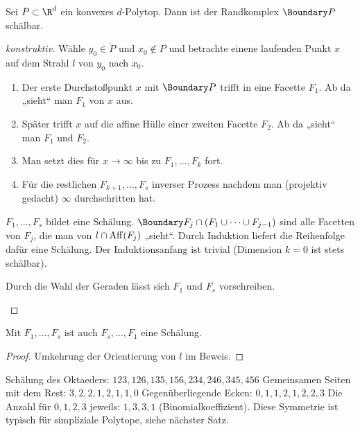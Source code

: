 \begin{st}
    Sei $P \subset \R^d$ ein konvexes $d$-Polytop.
    Dann ist der Randkomplex $\Boundary P$ schälbar.
    \begin{proof}[konstruktiv]
        Wähle $y_0 \in \mathring P$ und $x_0 \not\in P$ und betrachte einene laufenden Punkt $x$ auf dem Strahl $l$ von $y_0$ nach $x_0$.
        \begin{enumerate}[1.]
            \item
                Der erste Durchstoßpunkt $x$ mit $\Boundary P$ trifft in eine Facette $F_1$.
                Ab da „sieht“ man $F_1$ von $x$ aus.
            \item
                Später trifft $x$ auf die affine Hülle einer zweiten Facette $F_2$.
                Ab da „sieht“ man $F_1$ und $F_2$.
            \item
                Man setzt dies für $x \to \infty$ bis zu $F_1, \dotsc, F_k$ fort.
            \item
                Für die restlichen $F_{k+1}, \dotsc, F_s$ inverser Prozess nachdem man (projektiv gedacht) $\infty$ durchschritten hat.
        \end{enumerate}
        $F_1, \dotsc, F_s$ bildet eine Schälung.
        $\Boundary F_j \cap (F_1 \cup \dotsb \cup F_{j-1})$ sind alle Facetten von $F_j$, die man von $l \cap \operatorname { Aff }(F_j)$ „sieht“. 
        Durch Induktion liefert die Reihenfolge dafür eine Schälung.
        Der Induktionsanfang ist trivial (Dimension $k = 0$ ist stets schälbar).
        \begin{note}
            Durch die Wahl der Geraden lässt sich $F_1$ und $F_s$ vorschreiben.
        \end{note}
    \end{proof}
\end{st}

\begin{kor}
    Mit $F_1, \dotsc, F_s$ ist auch $F_s, \dotsc, F_1$ eine Schälung.
    \begin{proof}
        Umkehrung der Orientierung von $l$ im Beweis.
    \end{proof}
\end{kor}

\begin{ex}
    Schälung des Oktaeders:
    \begin{math}
        123, 126, 135, 156, 234, 246, 345, 456
    \end{math}
    Gemeinsamen Seiten mit dem Rest:
    \begin{math}
        3, 2, 2, 1, 2, 1, 1, 0
    \end{math}
    Gegenüberliegende Ecken:
    \begin{math}
        0, 1, 1, 2, 1, 2, 2, 3
    \end{math}
    Die Anzahl für $0, 1, 2, 3$ jeweils: $1, 3, 3, 1$ (Binomialkoeffizient).
    Diese Symmetrie ist typisch für simpliziale Polytope, siehe nächster Satz.
\end{ex}

